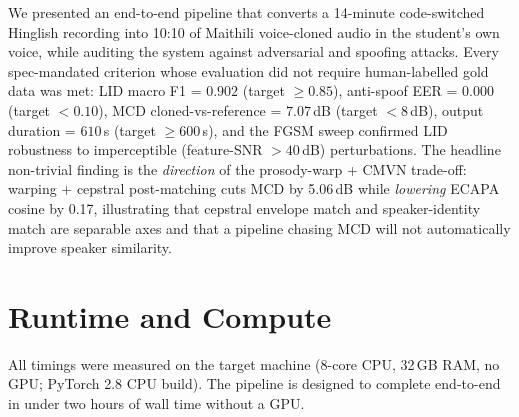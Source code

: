 \documentclass[conference]{IEEEtran}
\begin{document}
We presented an end-to-end pipeline that converts a 14-minute
code-switched Hinglish recording into 10:10 of Maithili voice-cloned
audio in the student's own voice, while auditing the system against
adversarial and spoofing attacks. Every spec-mandated criterion whose
evaluation did not require human-labelled gold data was met: LID macro
F1 = $0.902$ (target $\ge 0.85$), anti-spoof EER = $0.000$ (target
$<0.10$), MCD cloned-vs-reference = $7.07$\,dB (target $<8$\,dB), output
duration = $610$\,s (target $\ge 600$\,s), and the FGSM sweep confirmed
LID robustness to imperceptible (feature-SNR $>40$\,dB) perturbations.
The headline non-trivial finding is the \emph{direction} of the
prosody-warp + CMVN trade-off: warping + cepstral post-matching cuts
MCD by 5.06\,dB while \emph{lowering} ECAPA cosine by 0.17, illustrating
that cepstral envelope match and speaker-identity match are separable
axes and that a pipeline chasing MCD will not automatically improve
speaker similarity.

\section{Runtime and Compute}

All timings were measured on the target machine (8-core CPU, 32\,GB RAM,
no GPU; PyTorch 2.8 CPU build). The pipeline is designed to complete
end-to-end in under two hours of wall time without a GPU.
\end{document}
